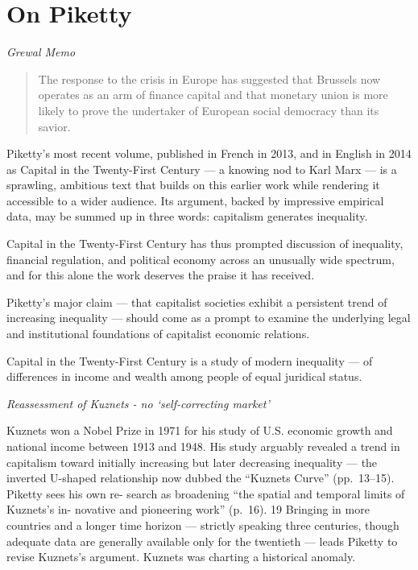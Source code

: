 \documentclass[
]{book}
\begin{document}
\hypertarget{on-piketty}{%
\section{On Piketty}\label{on-piketty}}

\emph{Grewal Memo}

\begin{quote}
The response to the crisis in Europe has suggested that Brussels now operates as an arm of finance capital and that monetary union is more likely to prove the undertaker of European social democracy than its savior.
\end{quote}

Piketty's most recent volume, published in French in 2013, and in English in 2014 as Capital in the Twenty-First Century --- a knowing nod to Karl Marx --- is a sprawling, ambitious text that builds on this earlier work while rendering it accessible to a wider audience. Its argument, backed by impressive empirical data, may be summed up in three words: capitalism generates inequality.

Capital in the Twenty-First Century has thus prompted discussion of inequality, financial regulation, and political economy across an unusually wide spectrum, and for this alone the work deserves the praise it has received.

Piketty's major claim --- that capitalist societies exhibit a persistent trend of increasing inequality --- should come as a prompt to examine the underlying legal and institutional foundations of capitalist economic relations.

Capital in the Twenty-First Century is a study of modern inequality ---
of differences in income and wealth among people of equal juridical
status.

\emph{Reassessment of Kuznets - no `self-correcting market'}

Kuznets won a Nobel Prize in 1971 for his study of U.S. economic growth
and national income between 1913 and 1948. His study arguably
revealed a trend in capitalism toward initially increasing but later
decreasing inequality --- the inverted U-shaped relationship now
dubbed the ``Kuznets Curve'' (pp.~13--15). Piketty sees his own re-
search as broadening ``the spatial and temporal limits of Kuznets's in-
novative and pioneering work'' (p.~16). 19 Bringing in more countries
and a longer time horizon --- strictly speaking three centuries, though
adequate data are generally available only for the twentieth --- leads
Piketty to revise Kuznets's argument.
Kuznets was charting a historical anomaly.
\end{document}
